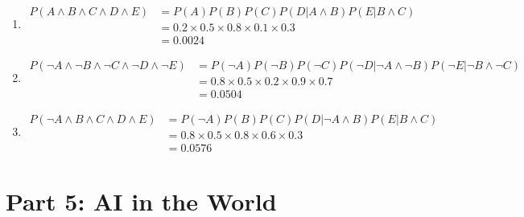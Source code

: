 \documentclass[11pt]{amsart}
\begin{document}
\begin{enumerate}

\item
\begin{align*}
P(A \wedge B \wedge C \wedge D \wedge E)
	&= P(A) P(B) P(C) P(D | A \wedge B) P(E | B \wedge C) \\
	&= 0.2 \times 0.5 \times 0.8 \times 0.1 \times 0.3 \\
	&= 0.0024
\end{align*}

\item
\begin{align*}
P(\neg A \wedge \neg B \wedge \neg C \wedge \neg D \wedge \neg E)
	&= P(\neg A) P(\neg B) P(\neg C) P(\neg D | \neg A \wedge \neg B) P(\neg E | \neg B \wedge \neg C) \\
	&= 0.8 \times 0.5 \times 0.2 \times 0.9 \times 0.7 \\
	&= 0.0504
\end{align*}

\item
\begin{align*}
P(\neg A \wedge B \wedge C \wedge D \wedge E)
	&= P(\neg A) P(B) P(C) P(D | \neg A \wedge B) P(E | B \wedge C) \\
	&= 0.8 \times 0.5 \times 0.8 \times 0.6 \times 0.3 \\
	&= 0.0576
\end{align*}

\end{enumerate}

\section*{Part 5: AI in the World}
\end{document}
